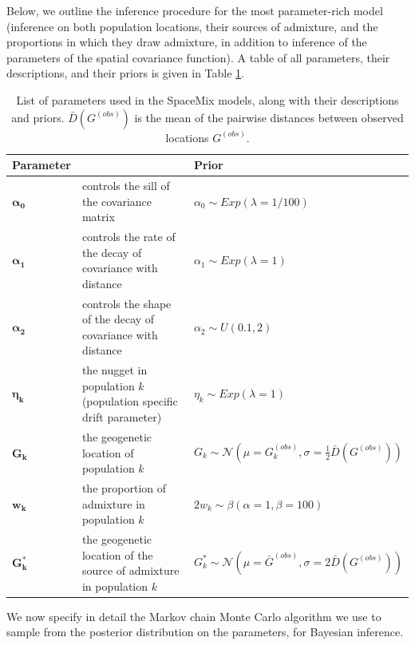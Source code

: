 \documentclass[10pt,letterpaper]{article}
\newcommand{\identifyadmixsource}[1]{{#1^{*}}}
\begin{document}
Below, we outline the inference procedure for the most parameter-rich model (inference on both population locations, their sources of admixture, and the proportions in which they draw admixture, in addition to inference of the parameters of the spatial covariance function).
A table of all parameters, their descriptions, and their priors is given in Table \ref{tab:param_prior_tab}.

\begin{centering}
\begin{table}
\begin{tabular}{| >{\centering\arraybackslash}m{2.0cm} | m{5.2cm} | >{\centering\arraybackslash}m{6.8cm} |}
	\hline
	\textbf{Parameter} & \centering{\textbf{Description}} & \textbf{Prior}\\ \hline
	$\boldsymbol{\alpha_0}$ & 
		controls the sill of the covariance matrix & 
		$\alpha_0 \sim Exp(\lambda = 1/100)$\\ \hline
	$\boldsymbol{\alpha_1}$ & 
		controls the rate of the decay of covariance with distance & 
		$\alpha_1 \sim Exp(\lambda = 1)$\\ \hline
	$\boldsymbol{\alpha_2}$ & 
		controls the shape of the decay of covariance with distance & 
		$\alpha_2 \sim U(0.1,2)$\\ \hline
	$\boldsymbol{\eta_k}$ & 
		the nugget in population $k$ (population specific drift parameter)  & 
		$\eta_k \sim Exp(\lambda = 1)$\\ \hline
	$\boldsymbol{G_k}$ & 
		the geogenetic location of population $k$ &
		 $G_k \sim \mathcal{N}(\mu = G^{(obs)}_k,\sigma = \frac{1}{2}\bar{D}(G^{(obs)}))$ \\ \hline
	$\boldsymbol{w_k}$ &
		the proportion of admixture in population $k$ &
		$2 w_k \sim \beta(\alpha = 1,\beta = 100)$  \\ \hline
	$\boldsymbol{\identifyadmixsource{G_k}}$ &
		the geogenetic location of the source of admixture in population $k$ &
		$\identifyadmixsource{G_k} \sim \mathcal{N}(\mu = \bar{G}^{(obs)},\sigma = 2 \bar{D}(G^{(obs)}))$ \\
	\hline
\end{tabular}
\caption{
List of parameters used in the SpaceMix models, along with their descriptions and priors.
$\bar{D}(G^{(obs)})$ is the mean of the pairwise distances between observed locations $G^{(obs)}$.
}\label{tab:param_prior_tab}
\end{table}
\end{centering}

We now specify in detail the Markov chain Monte Carlo algorithm we use to sample from the posterior distribution on the parameters,
for Bayesian inference.
\end{document}
